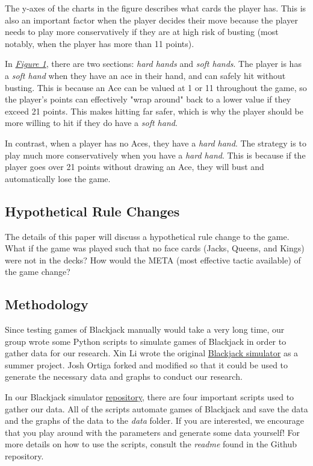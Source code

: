 \documentclass{article}
\begin{document}
{		The y-axes of the charts in the figure describes what cards the player has. This is also an important factor
		when the player decides their move because the player needs to play more conservatively if they are at high
		risk of busting (most notably, when the player has more than 11 points).
		
		In \hyperlink{fig1}{\textit{Figure 1}}, there are two sections: \textit{hard hands} and \textit{soft hands}. The player is
		has a \textit{soft hand} when they have an ace in their hand, and can safely hit without busting. This is
		because an Ace can be valued at 1 or 11 throughout the game, so the player's points can effectively "wrap around"
		back to a lower value if they exceed 21 points. This makes hitting far safer, which is why the player should
		be more willing to hit if they do have a \textit{soft hand}.

		In contrast, when a player has no Aces, they have a \textit{hard hand}. The strategy is to play much 
		more conservatively when you have a \textit{hard hand}. This is because if the player goes over 21 points
		without drawing an Ace, they will bust and automatically lose the game.



	\subsection{Hypothetical Rule Changes}
	\label{sec: Hypothetical Rule Changes}

		The details of this paper will discuss a hypothetical rule
		change to the game. What if the game was played such that no face cards (Jacks, Queens, and Kings) were not in the decks? How would
		the META (most effective tactic available) of the game change?

	\subsection{Methodology}
	\label{sec: Methodology}
		
		Since testing games of Blackjack manually would take a very long time, our group wrote some Python scripts to simulate
		games of Blackjack in order to gather data for our research. Xin Li wrote the original \href{https://github.com/JDzzz7/Blackjack}{Blackjack simulator} as a summer project.
		Josh Ortiga forked and modified so that it could be used to generate the necessary data and graphs to conduct our research.

		In our Blackjack simulator \href{https://github.com/hosua/blackjack-cs241}{repository}, there are four important scripts
		used to gather our data. All of the scripts automate games of Blackjack and save the data and the graphs of the data to the \textit{data} folder.
		If you are interested, we encourage that you play around with the parameters and generate some data yourself! For more details on how to use the scripts,
		consult the \textit{readme} found in the Github repository.
		\newpage 

}
\end{document}
